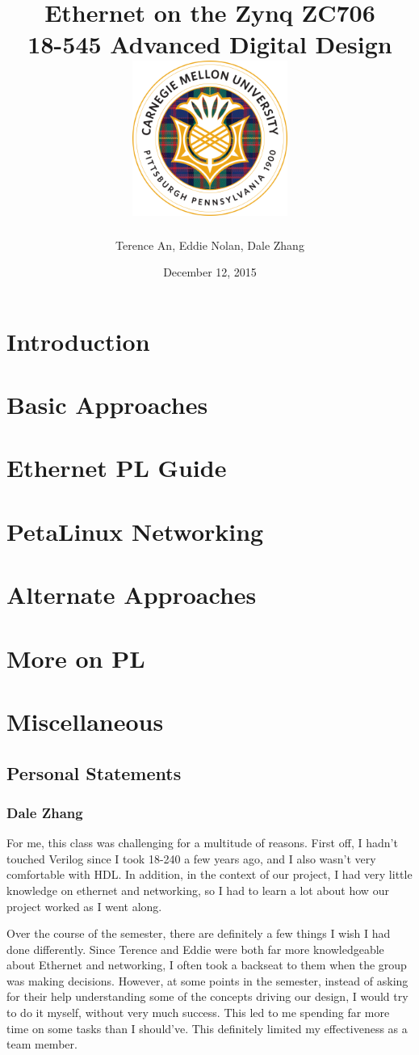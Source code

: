 \documentclass[12pt]{report}
\title{
  {Ethernet on the Zynq ZC706 \vspace{0.2in}}\\
  {\large 18-545 Advanced Digital Design \vspace{0.2in}}\\
  {\includegraphics[width=2in]{cmu_seal.png}}
}
\author{Terence An, Eddie Nolan, Dale Zhang}
\date{December 12, 2015}
\begin{document}
\maketitle

\chapter{Introduction}

\chapter{Basic Approaches}

\chapter{Ethernet PL Guide}

\chapter{PetaLinux Networking}

\chapter{Alternate Approaches}

\chapter{More on PL}

\chapter{Miscellaneous}
\section{Personal Statements}
\subsection{Dale Zhang}
For me, this class was challenging for a multitude of reasons. First off, I hadn't touched Verilog since I took 18-240 a few years ago, and I also wasn't very comfortable with HDL. In addition, in the context of our project, I had very little knowledge on ethernet and networking, so I had to learn a lot about how our project worked as I went along.

Over the course of the semester, there are definitely a few things I wish I had done differently. Since Terence and Eddie were both far more knowledgeable about Ethernet and networking, I often took a backseat to them when the group was making decisions. However, at some points in the semester, instead of asking for their help understanding some of the concepts driving our design, I would try to do it myself, without very much success. This led to me spending far more time on some tasks than I should've. This definitely limited my effectiveness as a team member.
\end{document}
